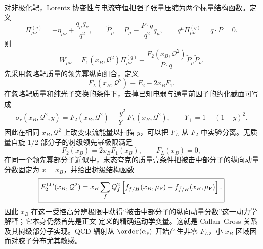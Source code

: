 对非极化靶，Lorentz 协变性与电流守恒把强子张量压缩为两个标量结构函数。定义
\begin{equation}
 \boxed{
 \Pi_{\mu\nu}^{(q)}=-\eta_{\mu\nu}+\frac{q_\mu q_\nu}{q^2},
 \qquad
 \widetilde P_\mu=P_\mu-\frac{P\cdot q}{q^2}q_\mu,}
 \qquad
 q^\mu\Pi_{\mu\nu}^{(q)}=q\cdot\widetilde P=0.
 \label{eq:dis-transverse-tensor-basis-dp68}
\end{equation}
则
\begin{equation}
 \boxed{
 W_{\mu\nu}
 =F_1(x_B,\mathcal Q^2)\Pi_{\mu\nu}^{(q)}
 +\frac{F_2(x_B,\mathcal Q^2)}{P\cdot q}
 \widetilde P_\mu\widetilde P_\nu.}
 \label{eq:dis-W-decomposition-dp13}
\end{equation}
先采用忽略靶质量的领先幂纵向组合，定义
\begin{equation}
 \boxed{F_L(x_B,\mathcal Q^2)\equiv F_2-2x_BF_1.}
 \label{eq:dis-longitudinal-structure-function-dp31}
\end{equation}
在忽略靶质量和纯光子交换的条件下，去掉已知电弱与通量前因子的约化截面可写成
\begin{equation}
 \boxed{
 \sigma_r(x_B,\mathcal Q^2,y)
 =F_2(x_B,\mathcal Q^2)
 -\frac{y^2}{Y_+}F_L(x_B,\mathcal Q^2),
 \qquad
 Y_+=1+(1-y)^2.}
 \label{eq:dis-reduced-cross-section-dp31}
\end{equation}
因此在相同 $x_B,\mathcal Q^2$ 上改变束流能量以扫描 $y$，可以把 $F_L$ 从 $F_2$ 中实验分离。无质量自旋 $1/2$ 部分子的树级领先幂极限满足
\begin{equation}
 \boxed{F_2(x_B)=2x_BF_1(x_B),\qquad F_L(x_B)=0,}
 \label{eq:dis-callan-gross-dp68}
\end{equation}
在同一个领先幂部分子近似中，末态夸克的质量壳条件把被击中部分子的纵向动量分数固定为 $x=x_B$，并给出树级结构函数
\begin{equation}
 \boxed{
 F_2^{\rm LO}(x_B,\mathcal Q^2)
 =x_B\sum_fQ_f^2\left[
 f_{f/H}(x_B,\mu_{\rm F})+f_{\bar f/H}(x_B,\mu_{\rm F})
 \right].}
 \label{eq:dis-tree-parton-f2-dp76}
\end{equation}
因此 $x_B$ 在这一受控高分辨极限中获得“被击中部分子的纵向动量分数”这一动力学解释；它本身仍然首先是正文 定义的精确运动学变量。这就是 Callan--Gross 关系及其树级部分子实现。QCD 辐射从 $\order(\alpha_s)$ 开始产生非零 $F_L$，小 $x_B$ 区域因而对胶子分布尤其敏感。

